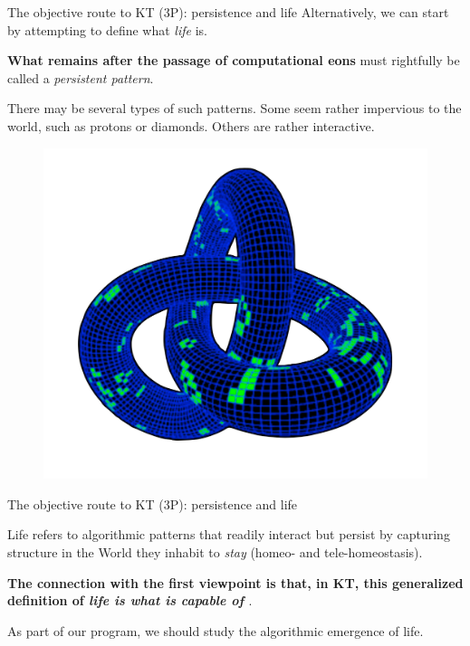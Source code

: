 
\begin{frame}[label=intro4]{The objective route to KT (3P): persistence and life}
Alternatively, we can start by attempting to define what {\em life} is.\vfill

\textbf{What remains after the passage of computational eons} must rightfully be called a {\em persistent pattern}.\vfill

There may be several types of such patterns. Some seem rather impervious to the world, such as protons or diamonds. Others are rather interactive. \vfill

\begin{figure}
    \centering
    \includegraphics[width=0.25\linewidth]{toruslife.png}
\end{figure}
\end{frame}

\begin{frame}[label=intro4]{The objective route to KT (3P): persistence and life}
\begin{definition}
Life refers to algorithmic patterns that readily interact but persist by capturing structure in the World they inhabit to \textit{stay} (homeo- and tele-homeostasis).  \end{definition}\vfill

 {\bf The connection with the first viewpoint is that, in KT, this {generalized definition of \em life is what is capable of \SEP}}. \vfill 
 
 As part of our program, we should study the algorithmic emergence of life. 
\end{frame}



